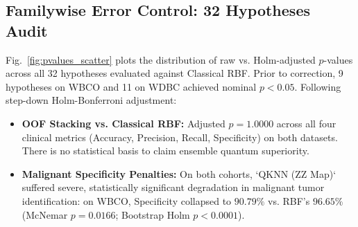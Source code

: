 \documentclass[journal,twocolumn]{IEEEtran}
\begin{document}
\subsection{Familywise Error Control: 32 Hypotheses Audit}
Fig.~\ref{fig:pvalues_scatter} plots the distribution of raw vs. Holm-adjusted $p$-values across all 32 hypotheses evaluated against Classical RBF. Prior to correction, 9 hypotheses on WBCO and 11 on WDBC achieved nominal $p < 0.05$. Following step-down Holm-Bonferroni adjustment:
\begin{itemize}
    \item \textbf{OOF Stacking vs. Classical RBF:} Adjusted $p = 1.0000$ across all four clinical metrics (Accuracy, Precision, Recall, Specificity) on both datasets. There is no statistical basis to claim ensemble quantum superiority.
    \item \textbf{Malignant Specificity Penalties:} On both cohorts, `QKNN (ZZ Map)` suffered severe, statistically significant degradation in malignant tumor identification: on WBCO, Specificity collapsed to $90.79\%$ vs. RBF's $96.65\%$ (McNemar $p = 0.0166$; Bootstrap Holm $p < 0.0001$).
\end{itemize}
\end{document}
